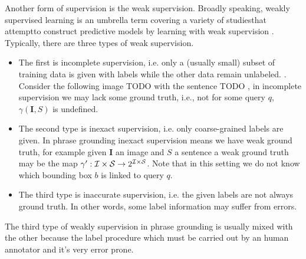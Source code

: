 Another form of supervision is the weak supervision. Broadly speaking,
weakly supervised learning is an umbrella term covering a variety of
studiesthat attemptto construct predictive models by learning with
weak supervision . Typically, there are three types of weak supervision. 

\begin{itemize}
    \item The first is incomplete supervision, i.e. only a (usually
small) subset of training data is given with labels while the other
data remain unlabeled. . Consider the following image TODO with the sentence
TODO \todo{}, in incomplete supervision we may lack some ground truth,
i.e., not for some query $q$, $\gamma(\bm{I}, S)$ is undefined.
    \item The second type is inexact supervision, i.e. only
coarse-grained labels are given. In phrase grounding inexact
supervision means we have weak ground truth, for example given
$\bm{I}$ an image and $S$ a sentence a weak ground truth may be the
map $\gamma' : \mathcal{I} \times \mathcal{S} \rightarrow 2^{\mathcal{I} \times \mathcal{S}}$.
Note that in this setting we do not know which bounding box $b$ is
linked to query $q$. 
    \item The third type is inaccurate supervision, i.e. the given
labels are not always ground truth.  In other words, some label
information may suffer from errors.
\end{itemize}

The third type of weakly supervision in phrase grounding is usually
mixed with the other because the label procedure which must be carried
out by an human annotator and it's very error prone.
